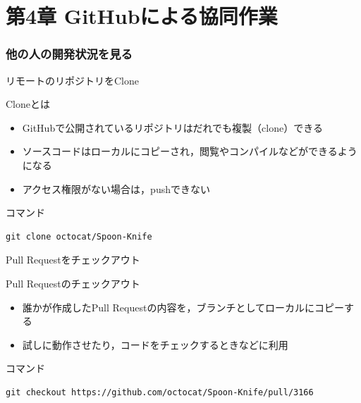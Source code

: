 \documentclass[t, aspectratio=169]{beamer}
\begin{document}
\part{第4章 GitHubによる協同作業}
\label{sec-4}
\section{他の人の開発状況を見る}
\label{sec-4-1}
\begin{frame}[fragile,label=sec-4-1-1]{リモートのリポジトリをClone}
 \begin{block}{Cloneとは}
\begin{itemize}
\item GitHubで公開されているリポジトリはだれでも複製（clone）できる
\item ソースコードはローカルにコピーされ，閲覧やコンパイルなどができるようになる
\item アクセス権限がない場合は，pushできない
\end{itemize}
\end{block}
\begin{block}{コマンド}
\begin{verbatim}
git clone octocat/Spoon-Knife
\end{verbatim}
\end{block}
\end{frame}

\begin{frame}[fragile,label=sec-4-1-2]{Pull Requestをチェックアウト}
 \begin{block}{Pull Requestのチェックアウト}
\begin{itemize}
\item 誰かが作成したPull Requestの内容を，ブランチとしてローカルにコピーする
\item 試しに動作させたり，コードをチェックするときなどに利用
\end{itemize}
\end{block}
\begin{block}{コマンド}
\begin{verbatim}
git checkout https://github.com/octocat/Spoon-Knife/pull/3166
\end{verbatim}
\end{block}
\end{frame}
\end{document}
